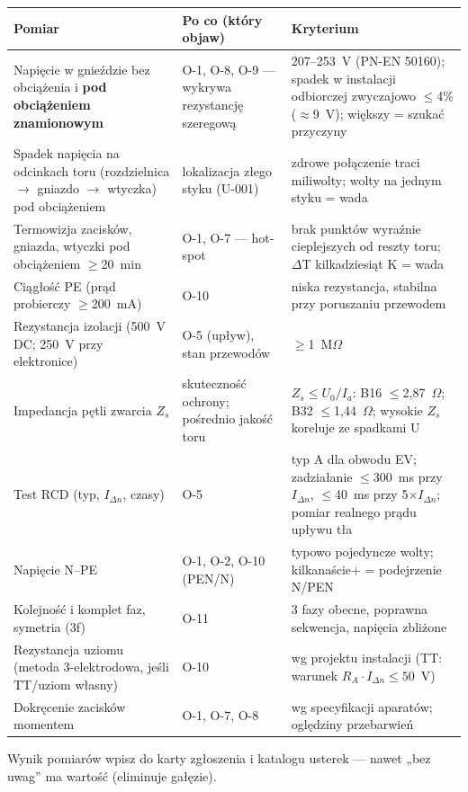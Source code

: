\documentclass[11pt]{article}
\newcommand{\key}[1]{\textbf{\color{navy}#1}}
\begin{document}
{\small
\begin{tabularx}{\textwidth}{@{}p{4.6cm}Yp{3.9cm}@{}}
\toprule
\textbf{\sffamily Pomiar} & \textbf{\sffamily Po co (który objaw)} & \textbf{\sffamily Kryterium}\\
\midrule
Napięcie w gnieździe bez obciążenia i \key{pod obciążeniem znamionowym} & O-1, O-8, O-9 — wykrywa rezystancję szeregową & 207--253~V (PN-EN 50160); spadek w instalacji odbiorczej zwyczajowo $\leq$4\% ($\approx$9~V); większy = szukać przyczyny\\
Spadek napięcia na odcinkach toru (rozdzielnica $\rightarrow$ gniazdo $\rightarrow$ wtyczka) pod obciążeniem & lokalizacja złego styku (U-001) & zdrowe połączenie traci miliwolty; wolty na jednym styku = wada\\
Termowizja zacisków, gniazda, wtyczki pod obciążeniem $\geq$20~min & O-1, O-7 — hot-spot & brak punktów wyraźnie cieplejszych od reszty toru; $\Delta$T kilkadziesiąt K = wada\\
Ciągłość PE (prąd probierczy $\geq$200~mA) & O-10 & niska rezystancja, stabilna przy poruszaniu przewodem\\
Rezystancja izolacji (500~V DC; 250~V przy elektronice) & O-5 (upływ), stan przewodów & $\geq$1~M$\Omega$\\
Impedancja pętli zwarcia $Z_s$ & skuteczność ochrony; pośrednio jakość toru & $Z_s \leq U_0/I_a$: B16 $\leq$2,87~$\Omega$; B32 $\leq$1,44~$\Omega$; wysokie $Z_s$ koreluje ze spadkami U\\
Test RCD (typ, $I_{\Delta n}$, czasy) & O-5 & typ A dla obwodu EV; zadziałanie $\leq$300~ms przy $I_{\Delta n}$, $\leq$40~ms przy 5$\times I_{\Delta n}$; pomiar realnego prądu upływu tła\\
Napięcie N--PE & O-1, O-2, O-10 (PEN/N) & typowo pojedyncze wolty; kilkanaście+ = podejrzenie N/PEN\\
Kolejność i komplet faz, symetria (3f) & O-11 & 3 fazy obecne, poprawna sekwencja, napięcia zbliżone\\
Rezystancja uziomu (metoda 3-elektrodowa, jeśli TT/uziom własny) & O-10 & wg projektu instalacji (TT: warunek $R_A \cdot I_{\Delta n} \leq 50$~V)\\
Dokręcenie zacisków momentem & O-1, O-7, O-8 & wg specyfikacji aparatów; oględziny przebarwień\\
\bottomrule
\end{tabularx}
}

Wynik pomiarów wpisz do karty zgłoszenia i katalogu usterek — nawet „bez uwag'' ma wartość (eliminuje gałęzie).
\end{document}
